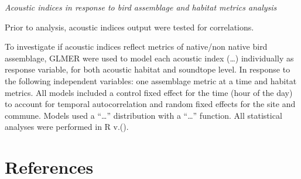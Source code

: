\documentclass[
  french,
  11pt,
]{stylisharticle}
\begin{document}
\emph{Acoustic indices in response to bird assemblage and habitat
metrics analysis}

Prior to analysis, acoustic indices output were tested for correlations.

To investigate if acoustic indices reflect metrics of native/non native
bird assemblage, GLMER were used to model each acoustic index (\ldots)
individually as response variable, for both acoustic habitat and
soundtope level. In response to the following independent variables: one
assemblage metric at a time and habitat metrics. All models included a
control fixed effect for the time (hour of the day) to account for
temporal autocorrelation and random fixed effects for the site and
commune. Models used a \enquote{\ldots{}} distribution with a
\enquote{\ldots{}} function. All statistical analyses were performed in
R v.().

\section*{References}\label{bibliography}
\end{document}

